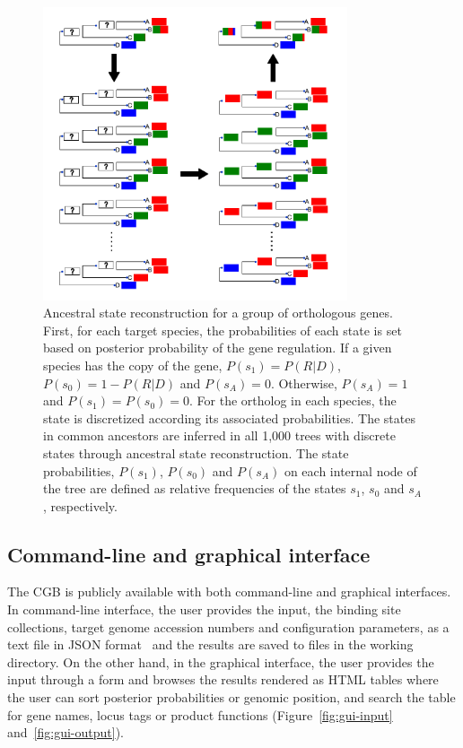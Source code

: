 \documentclass[12pt]{article}
\begin{document}
\begin{figure}
  \centering
  \includegraphics[width=0.8\textwidth]{figures/chapter4/asr}
  \caption{Ancestral state reconstruction for a group of orthologous genes.
    First, for each target species, the probabilities of each state is set
    based on posterior probability of the gene regulation. If a given species
    has the copy of the gene, $P(s_1) = P(R|D)$, $P(s_0) = 1-P(R|D)$ and
    $P(s_A) = 0$.  Otherwise, $P(s_A) = 1$ and $P(s_1) = P(s_0) = 0$. For the
    ortholog in each species, the state is discretized according its associated
    probabilities. The states in common ancestors are inferred in all 1,000
    trees with discrete states through ancestral state reconstruction. The
    state probabilities, $P(s_1)$, $P(s_0)$ and $P(s_A)$ on each internal node
    of the tree are defined as relative frequencies of the states $s_1$, $s_0$
    and $s_A$, respectively.}
  \label{fig:asr}
\end{figure}

\subsection{Command-line and graphical interface}

The CGB is publicly available with both command-line and graphical
interfaces. In command-line interface, the user provides the input, the binding
site collections, target genome accession numbers and configuration parameters,
as a text file in JSON format~\cite{bray2014javascript} and the results are
saved to files in the working directory. On the other hand, in the graphical
interface, the user provides the input through a form and browses the results
rendered as HTML tables where the user can sort posterior probabilities or
genomic position, and search the table for gene names, locus tags or product
functions (Figure~\ref{fig:gui-input} and~\ref{fig:gui-output}).
\end{document}

